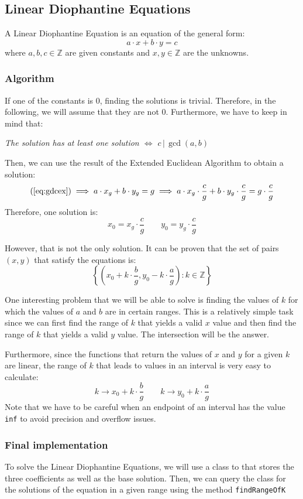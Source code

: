 \subsection{Linear Diophantine Equations}
A Linear Diophantine Equation is an equation of the general form:
\[
		a \cdot x + b \cdot y  = c
\]
where $a,b,c\in \mathbb{Z}$ are given constants  
and $x,y\in \mathbb{Z}$ are the unknowns.
\subsubsection{Algorithm}
If one of the constants is 0, finding the solutions is trivial. Therefore,
in the following, we will assume that they are not 0. Furthermore, we have
to keep in mind that:
\begin{center}
		\itshape
		The solution has at least one solution $\iff$ $c \,| \,\gcd(a,b)$
\end{center}
Then, we can use
the result of the Extended Euclidean Algorithm to obtain a solution:
\[
		(\ref{eq:gdcex}) \implies a \cdot x_g + b\cdot y_g = g \implies 
		a \cdot x_g \cdot \frac{c}{g}+ b\cdot y_g\cdot \frac{c}{g}= g 
		\cdot \frac{c}{g}
\]
Therefore, one solution is:
\[
		x_0 = x_g \cdot \frac{c}{g} \qquad
		y_0 = y_g \cdot \frac{c}{g} 
\]

However, that is not the only solution. It can be proven that the set of
pairs $(x,y)$ that satisfy the equations is:
\[
		\left \{ \left( x_0 + k \cdot \frac{b}{g}, 
		y_0 - k \cdot \frac{a}{g}\right): k\in \mathbb{Z} \right \}
\]

One interesting problem that we will be able to solve is finding the 
values of $k$ for which the values of $a$ and $b$ are in certain 
ranges. This is a relatively simple task since we can first find the 
range of $k$ that yields a valid $x$ value and then find the range
of $k$ that yields a valid $y$ value. The intersection will be the
answer.

Furthermore, since the functions that return the values of $x$ and 
$y$ for a given $k$
are linear, the range of $k$ that leads to values in an interval is
very easy to calculate: 
\[
		k \longrightarrow x_0 + k \cdot \frac{b}{g} \qquad
		k \longrightarrow y_0 + k \cdot\frac{a}{g}
\]
Note that we have to be careful when an endpoint of an interval 
has the value \texttt{inf} to avoid precision and overflow 
issues.

\newpage
{}


\subsubsection{Final implementation}
To solve the Linear Diophantine Equations, we will use a class to
that stores the three coefficients as well as the base solution.
Then, we can query the class for the solutions of the equation in 
a given range using the method \texttt{findRangeOfK}

